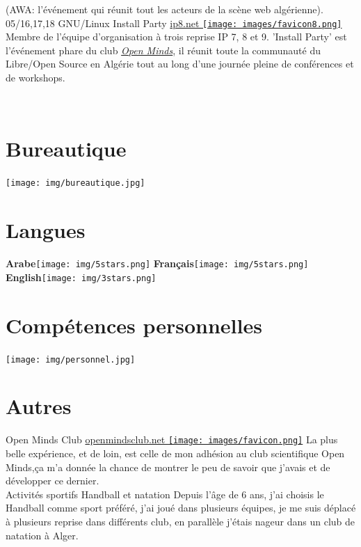 \documentclass[]{friggeri-cv}
\begin{document}
\begin{entrylist}
{    (AWA: l’événement qui réunit tout les acteurs de la scène web algérienne).\\}
  \entry
    {05/16,17,18}
    {GNU/Linux Install Party}
    {\href{https://www.openmindsclub.net/ip8}{ip8.net \texttt{[image: images/favicon8.png]}}}
    {Membre de l'équipe d'organisation à trois reprise IP 7, 8 et 9. 'Install Party' est l’événement phare du club \href{http://www.openmindsclub.net/}{\emph{Open Minds}}, il réunit toute la communauté du Libre/Open Source en Algérie tout au long d'une journée pleine de conférences et de workshops.\\}
    
\end{entrylist}

\begin{aside}
~
~
~
~
  \section{Bureautique}
    \texttt{[image: img/bureautique.jpg]}
    ~
    ~
  \section{Langues}
    \textbf{Arabe}\texttt{[image: img/5stars.png]}
    \textbf{Français}\texttt{[image: img/5stars.png]}
    \textbf{English}\texttt{[image: img/3stars.png]}
    ~
    ~
  \section{Compétences personnelles}
    \texttt{[image: img/personnel.jpg]}
    ~
\end{aside}

\section{Autres}
\begin{entrylist}
   \entry
    { }
    {Open Minds Club}
    {\href{http://www.openmindsclub.net}{openmindsclub.net \texttt{[image: images/favicon.png]}}}
    {La plus belle expérience, et de loin, est celle de mon adhésion au club scientifique Open Minds,ça m'a donnée la chance de montrer le peu de savoir que j'avais et de développer ce dernier.\\}
  \entry
    { }
    {Activités sportifs}
    {Handball et natation}
    {Depuis l'âge de 6 ans, j'ai choisis le Handball comme sport préféré, j'ai joué dans plusieurs équipes, je me suis déplacé à plusieurs reprise dans différents club, en parallèle j'étais nageur dans un club de natation à Alger.\\}
\end{entrylist}
\end{document}
